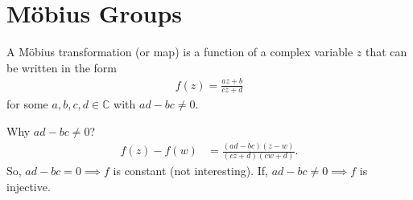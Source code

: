 \section{M\"obius Groups}

\begin{definition}
A M\"obius transformation (or map) is a function of a complex variable $z$ that can be written in the form 
\begin{align*}
    f(z) = \frac{az + b}{cz + d}
\end{align*} for some $a, b, c, d \in \mathbb{C}$ with $ad - bc \neq 0$.
\end{definition} 

Why $ad - bc \neq 0$?
\begin{align*}
    f(z) - f(w) &= \frac{(ad - bc)(z - w)}{(cz + d) (cw + d)}.
\end{align*} 
So, $ad - bc = 0 \implies f$ is constant (not interesting).
If,  $ad - bc \neq 0 \implies f$ is injective.


